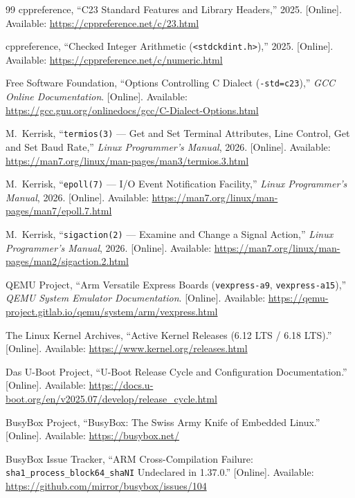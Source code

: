 \documentclass[11pt,a4paper,oneside]{report}
\begin{document}
\begin{thebibliography}{99}
cppreference, ``C23 Standard Features and Library Headers,'' 2025. [Online]. Available: \url{https://cppreference.net/c/23.html}

cppreference, ``Checked Integer Arithmetic (\texttt{<stdckdint.h>}),'' 2025. [Online]. Available: \url{https://cppreference.net/c/numeric.html}

Free Software Foundation, ``Options Controlling C Dialect (\texttt{-std=c23}),'' \emph{GCC Online Documentation}. [Online]. Available: \url{https://gcc.gnu.org/onlinedocs/gcc/C-Dialect-Options.html}

M.~Kerrisk, ``\texttt{termios(3)} --- Get and Set Terminal Attributes, Line Control, Get and Set Baud Rate,'' \emph{Linux Programmer's Manual}, 2026. [Online]. Available: \url{https://man7.org/linux/man-pages/man3/termios.3.html}

M.~Kerrisk, ``\texttt{epoll(7)} --- I/O Event Notification Facility,'' \emph{Linux Programmer's Manual}, 2026. [Online]. Available: \url{https://man7.org/linux/man-pages/man7/epoll.7.html}

M.~Kerrisk, ``\texttt{sigaction(2)} --- Examine and Change a Signal Action,'' \emph{Linux Programmer's Manual}, 2026. [Online]. Available: \url{https://man7.org/linux/man-pages/man2/sigaction.2.html}

QEMU Project, ``Arm Versatile Express Boards (\texttt{vexpress-a9}, \texttt{vexpress-a15}),'' \emph{QEMU System Emulator Documentation}. [Online]. Available: \url{https://qemu-project.gitlab.io/qemu/system/arm/vexpress.html}

The Linux Kernel Archives, ``Active Kernel Releases (6.12 LTS / 6.18 LTS).'' [Online]. Available: \url{https://www.kernel.org/releases.html}

Das U-Boot Project, ``U-Boot Release Cycle and Configuration Documentation.'' [Online]. Available: \url{https://docs.u-boot.org/en/v2025.07/develop/release_cycle.html}

BusyBox Project, ``BusyBox: The Swiss Army Knife of Embedded Linux.'' [Online]. Available: \url{https://busybox.net/}

BusyBox Issue Tracker, ``ARM Cross-Compilation Failure: \texttt{sha1\_process\_block64\_shaNI} Undeclared in 1.37.0.'' [Online]. Available: \url{https://github.com/mirror/busybox/issues/104}

\end{thebibliography}
\end{document}
